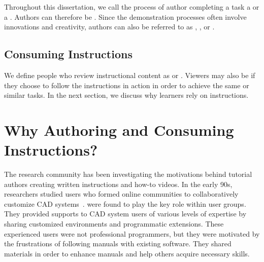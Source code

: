 Throughout this dissertation, we call the process of author completing a task a  or a . Authors can therefore be .
%
Since the demonstration processes often involve innovations and creativity, authors can also be referred to as , , or .
%


\subsection{Consuming Instructions}
We define people who review instructional content as  or . Viewers may also be  if they choose to follow the instructions in action in order to achieve the same or similar tasks. In the next section, we discuss why learners rely on instructions.



\section{Why Authoring and Consuming Instructions?}
\label{background_why}

The research community has been investigating the motivations behind tutorial authors creating written instructions and how-to videos.
%
In the early 90s, researchers studied users who formed online communities to collaboratively customize CAD systems~\cite{Gantt:1992:GGP:142750.142767}.  were found to play the key role within user groups. They provided supports to CAD system users of various levels of expertise by sharing customized environments and programmatic extensions. These experienced users were not professional programmers, but they were motivated by the frustrations of following manuals with existing software. They shared materials in order to enhance manuals and help others acquire necessary skills.

